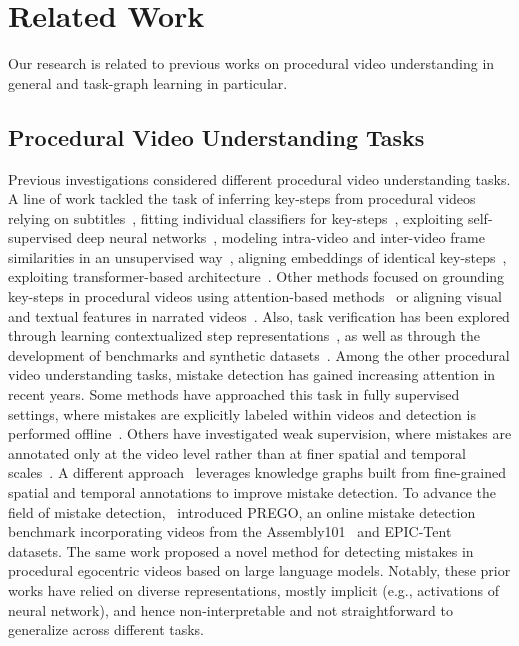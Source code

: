 \section{Related Work}
Our research is related to previous works on procedural video understanding in general and task-graph learning in particular.

\subsection{Procedural Video Understanding Tasks}
\label{sec:procedure_understanding}
Previous investigations considered different procedural video understanding tasks.
A line of work tackled the task of inferring key-steps from procedural videos relying on subtitles~\cite{zhou2018towards}, fitting individual classifiers for key-steps~\cite{zhukov2019cross}, exploiting self-supervised deep neural networks~\cite{elhamifar2020self}, modeling intra-video and inter-video frame similarities in an unsupervised way~\cite{bansal2022my}, aligning embeddings of identical key-steps~\cite{bansal2024united}, exploiting transformer-based architecture~\cite{dvornik2023stepformer}.
Other methods focused on grounding key-steps in procedural videos using attention-based methods~\cite{lu2022set} or aligning visual and textual features in narrated videos~\cite{miech2020end}. Also, task verification has been explored through learning contextualized step representations~\cite{narasimhan2023learning}, as well as through the development of benchmarks and synthetic datasets~\cite{hazra2023egotv}.
Among the other procedural video understanding tasks, mistake detection has gained increasing attention in recent years. Some methods have approached this task in fully supervised settings, where mistakes are explicitly labeled within videos and detection is performed offline~\cite{peddi2023captaincook4d,sener2022assembly101,wang2023holoassist}. Others have investigated weak supervision, where mistakes are annotated only at the video level rather than at finer spatial and temporal scales~\cite{ghoddoosian2023weakly}. A different approach~\cite{ding2023every} leverages knowledge graphs built from fine-grained spatial and temporal annotations to improve mistake detection.
To advance the field of mistake detection,~\cite{flaborea2024prego} introduced PREGO, an online mistake detection benchmark incorporating videos from the Assembly101~\cite{sener2022assembly101} and EPIC-Tent~\cite{jang2019epic} datasets. The same work proposed a novel method for detecting mistakes in procedural egocentric videos based on large language models.
Notably, these prior works have relied on diverse representations, mostly implicit (e.g., activations of neural network), and hence non-interpretable and not straightforward to generalize across different tasks.

